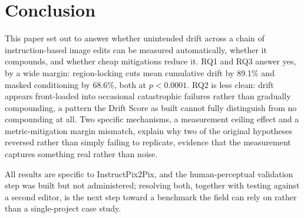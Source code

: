 \vspace{-8pt}
\section{Conclusion}
This paper set out to answer whether unintended drift across a chain of instruction-based image edits can be measured automatically, whether it compounds, and whether cheap mitigations reduce it. RQ1 and RQ3 answer yes, by a wide margin: region-locking cuts mean cumulative drift by 89.1\% and masked conditioning by 68.6\%, both at $p<0.0001$. RQ2 is less clean: drift appears front-loaded into occasional catastrophic failures rather than gradually compounding, a pattern the Drift Score as built cannot fully distinguish from no compounding at all. Two specific mechanisms, a measurement ceiling effect and a metric-mitigation margin mismatch, explain why two of the original hypotheses reversed rather than simply failing to replicate, evidence that the measurement captures something real rather than noise.

All results are specific to InstructPix2Pix, and the human-perceptual validation step was built but not administered; resolving both, together with testing against a second editor, is the next step toward a benchmark the field can rely on rather than a single-project case study.
